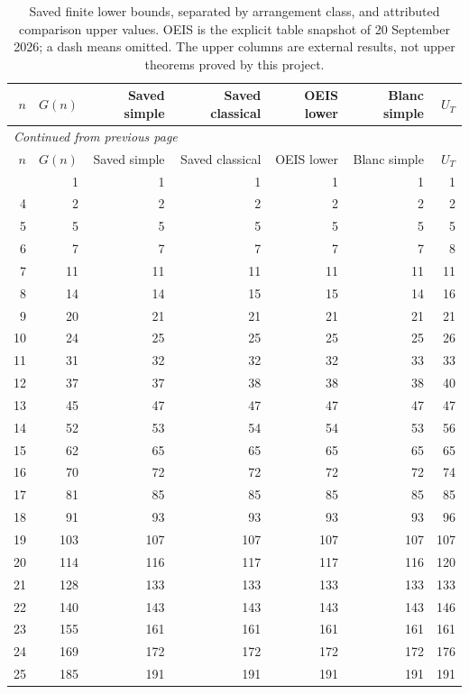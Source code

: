 
\begingroup
\small
\setlength{\tabcolsep}{6pt}
\begin{longtable}{rrrrrrr}
\caption{Saved finite lower bounds, separated by arrangement class, and attributed comparison upper values. OEIS is the explicit table snapshot of 20 September 2026; a dash means omitted. The upper columns are external results, not upper theorems proved by this project.}\label{exp:finite-table}\\
\toprule
$n$ & $G(n)$ & Saved simple & Saved classical & OEIS lower & Blanc simple & $U_T$\\
\midrule
\endfirsthead
\multicolumn{7}{l}{\small\itshape Continued from previous page}\\
\toprule
$n$ & $G(n)$ & Saved simple & Saved classical & OEIS lower & Blanc simple & $U_T$\\
\midrule
\endhead
\midrule
\endfoot
\bottomrule
\endlastfoot
3 & 1 & 1 & 1 & 1 & 1 & 1 \\
4 & 2 & 2 & 2 & 2 & 2 & 2 \\
5 & 5 & 5 & 5 & 5 & 5 & 5 \\
6 & 7 & 7 & 7 & 7 & 7 & 8 \\
7 & 11 & 11 & 11 & 11 & 11 & 11 \\
8 & 14 & 14 & 15 & 15 & 14 & 16 \\
9 & 20 & 21 & 21 & 21 & 21 & 21 \\
10 & 24 & 25 & 25 & 25 & 25 & 26 \\
11 & 31 & 32 & 32 & 32 & 33 & 33 \\
12 & 37 & 37 & 38 & 38 & 38 & 40 \\
13 & 45 & 47 & 47 & 47 & 47 & 47 \\
14 & 52 & 53 & 54 & 54 & 53 & 56 \\
15 & 62 & 65 & 65 & 65 & 65 & 65 \\
16 & 70 & 72 & 72 & 72 & 72 & 74 \\
17 & 81 & 85 & 85 & 85 & 85 & 85 \\
18 & 91 & 93 & 93 & 93 & 93 & 96 \\
19 & 103 & 107 & 107 & 107 & 107 & 107 \\
20 & 114 & 116 & 117 & 117 & 116 & 120 \\
21 & 128 & 133 & 133 & 133 & 133 & 133 \\
22 & 140 & 143 & 143 & 143 & 143 & 146 \\
23 & 155 & 161 & 161 & 161 & 161 & 161 \\
24 & 169 & 172 & 172 & 172 & 172 & 176 \\
25 & 185 & 191 & 191 & 191 & 191 & 191 \\

\end{longtable}

